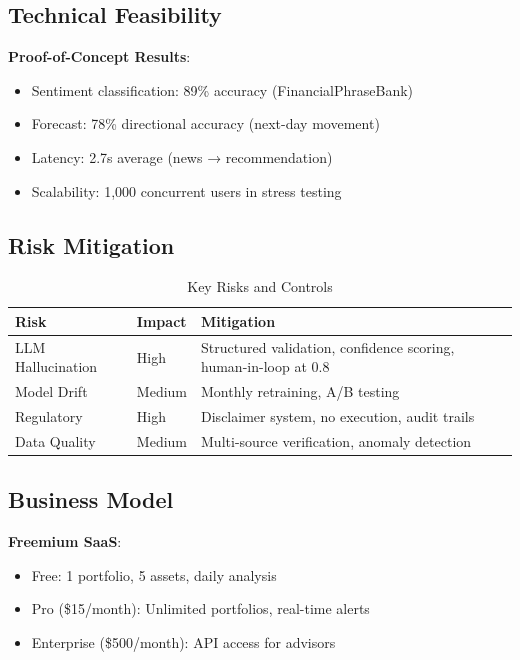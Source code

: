 \documentclass[conference]{IEEEtran}
\begin{document}
    \subsection{Technical Feasibility}
    \textbf{Proof-of-Concept Results}:
    \begin{itemize}
        \item Sentiment classification: 89\% accuracy (FinancialPhraseBank)
        \item Forecast: 78\% directional accuracy (next-day movement)
        \item Latency: 2.7s average (news → recommendation)
        \item Scalability: 1,000 concurrent users in stress testing
    \end{itemize}

    \subsection{Risk Mitigation}
    \begin{table}[htbp]
    \caption{Key Risks and Controls}
    \begin{center}
    \scriptsize
    \begin{tabular}{|p{1.8cm}|p{2cm}|p{2.7cm}|}
    \hline
    \textbf{Risk} & \textbf{Impact} & \textbf{Mitigation} \\
    \hline
    LLM Hallucination & High & Structured validation, confidence scoring, human-in-loop at 0.8 \\
    \hline
    Model Drift & Medium & Monthly retraining, A/B testing \\
    \hline
    Regulatory & High & Disclaimer system, no execution, audit trails \\
    \hline
    Data Quality & Medium & Multi-source verification, anomaly detection \\
    \hline
    \end{tabular}
    \label{tab:risks}
    \end{center}
    \end{table}

    \subsection{Business Model}
    \textbf{Freemium SaaS}:
    \begin{itemize}
        \item Free: 1 portfolio, 5 assets, daily analysis
        \item Pro (\$15/month): Unlimited portfolios, real-time alerts
        \item Enterprise (\$500/month): API access for advisors
    \end{itemize}
\end{document}
